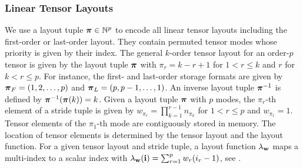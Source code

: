 \subsubsection{Linear Tensor Layouts}
\label{sec:preliminaries:layout}
We use a layout tuple $\boldsymbol{\pi} \in \mathbb{N}^p$ to encode all linear tensor layouts including the first-order or last-order layout.
They contain permuted tensor modes whose priority is given by their index.
The general $k$-order tensor layout for an order-$p$ tensor is given by the layout tuple $\boldsymbol{\pi}$ with $\pi_r = k-r+1$ for $1 < r \leq k$ and $r$ for $k < r \leq p$.
For instance, the first- and last-order storage formats are given by $\boldsymbol{\pi}_F = (1,2,\dots,p)$ and $\boldsymbol{\pi}_{L} = (p,p-1,\dots,1)$.
An inverse layout tuple $\boldsymbol{\pi}^{-1}$ is defined by $\boldsymbol{\pi}^{-1}(\boldsymbol{\pi}(k)) = k$.
Given a layout tuple $\boldsymbol{\pi}$ with $p$ modes, the $\pi_r$-th element of a stride tuple is given by $w_{\pi_r} = \prod_{k=1}^{r-1} n_{\pi_k}$ for $1 < r \leq p$ and $w_{\pi_1} = 1$.
Tensor elements of the $\pi_1$-th mode are contiguously stored in memory.
The location of tensor elements is determined by the tensor layout and the layout function.
For a given tensor layout and stride tuple, a layout function $\lambda_{\mathbf{w}}$ maps a multi-index to a scalar index with $\lambda_{\mathbf{w}}(\mathbf{i}) = \sum_{r=1}^p w_r (i_r-1)$, see \cite{bassoy:2018:fast,pawlowski:2019:morton.tensor.computations}.
\vspace{-1em}

